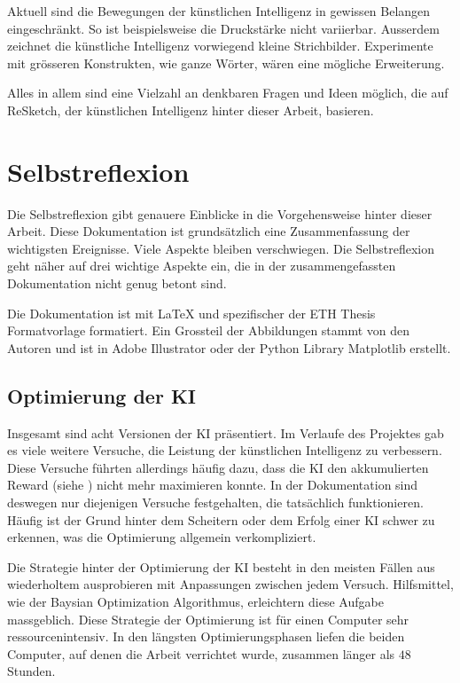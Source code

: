 Aktuell sind die Bewegungen der künstlichen Intelligenz in
gewissen Belangen eingeschränkt. So ist beispielsweise die Druckstärke nicht
variierbar. Ausserdem zeichnet die künstliche Intelligenz vorwiegend kleine
Strichbilder. Experimente mit grösseren Konstrukten, wie ganze Wörter, wären
eine mögliche Erweiterung.
 
Alles in allem sind eine Vielzahl an denkbaren Fragen und Ideen möglich, die auf
ReSketch, der künstlichen Intelligenz hinter dieser Arbeit, basieren.
 
 
\section{Selbstreflexion}\label{chap:d_reflex} Die Selbstreflexion gibt genauere
Einblicke in die Vorgehensweise hinter dieser Arbeit. Diese Dokumentation ist
grundsätzlich eine Zusammenfassung der wichtigsten Ereignisse. Viele Aspekte
bleiben verschwiegen. Die Selbstreflexion geht näher auf drei wichtige Aspekte
ein, die in der zusammengefassten Dokumentation nicht genug betont sind.
 
Die Dokumentation ist mit LaTeX und spezifischer der ETH Thesis Formatvorlage
\cite{noauthor_cadmo_2014} formatiert. Ein Grossteil der Abbildungen stammt von
den Autoren und ist in Adobe Illustrator oder der Python Library Matplotlib
erstellt.
 
\subsection{Optimierung der KI}\label{sub:d_reflex_opti} Insgesamt sind acht
Versionen der KI präsentiert. Im Verlaufe des Projektes gab es viele weitere
Versuche, die Leistung der künstlichen Intelligenz zu verbessern. Diese Versuche
führten allerdings häufig dazu, dass die KI den akkumulierten Reward (siehe
) nicht mehr maximieren konnte. In der Dokumentation
sind deswegen nur diejenigen Versuche festgehalten, die tatsächlich
funktionieren. Häufig ist der Grund hinter dem Scheitern oder dem Erfolg einer
KI schwer zu erkennen, was die Optimierung allgemein verkompliziert.
 
Die Strategie hinter der Optimierung der KI besteht in den meisten Fällen aus
wiederholtem ausprobieren mit Anpassungen zwischen jedem Versuch. Hilfsmittel,
wie der Baysian Optimization Algorithmus, erleichtern diese Aufgabe massgeblich.
Diese Strategie der Optimierung ist für einen Computer sehr ressourcenintensiv.
In den längsten Optimierungsphasen liefen die beiden Computer, auf denen die
Arbeit verrichtet wurde, zusammen länger als $48$ Stunden.
 
